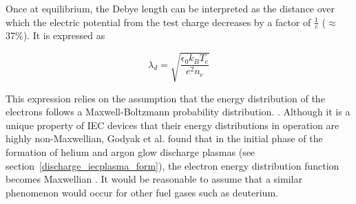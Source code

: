 \documentclass[a4paper,titlepage]{article}
\let\cite\parencite
\begin{document}
\begin{flushleft}




Once at equilibrium, the Debye length can be interpreted as the distance over which the electric potential from the test charge decreases by a factor of $\frac{1}{e}$ ($\approx$ 37\%). It is expressed as 

\begin{equation}
\lambda_d = \sqrt{\frac{\epsilon_0 k_B T_e}{e^2 n_e}}
\end{equation}

This expression relies on the assumption that the energy distribution of the electrons follows a Maxwell-Boltzmann probability distribution. \cite{freidberg_2008_plasma}. Although it is a unique property of IEC devices that their energy distributions in operation are highly non-Maxwellian, Godyak et al. found that in the initial phase of the formation of helium and argon glow discharge plasmas (see section~\ref{discharge_iecplasma_form}), the electron energy distribution function becomes Maxwellian \cite{godyak_1992_evolution}. It would be reasonable to assume that a similar phenomenon would occur for other fuel gases such as deuterium.


\end{flushleft}
\end{document}
